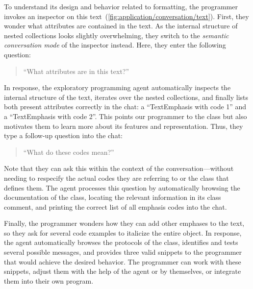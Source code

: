 To understand its design and behavior related to formatting, the programmer invokes an inspector on this text~(\cref{fig:application/conversation/text}).
First, they wonder what attributes are contained in the text.
As the internal structure of nested collections looks slightly overwhelming, they switch to the \emph{semantic conversation mode} of the inspector instead.
Here, they enter the following question:

\begin{quote}
	``What attributes are in this text?''
\end{quote}

In response, the exploratory programming agent automatically inspects the internal structure of the text, iterates over the nested collections, and finally lists both present attributes correctly in the chat: a ``TextEmphasis with code 1'' and a ``TextEmphasis with code 2''.
This points our programmer to the  class but also motivates them to learn more about its features and representation.
Thus, they type a follow-up question into the chat:

\begin{quote}
	``What do these codes mean?''
\end{quote}

Note that they can ask this within the context of the conversation---without needing to respecify the actual codes they are referring to or the class that defines them.
The agent processes this question by automatically browsing the documentation of the  class, locating the relevant information in its class comment, and printing the correct list of all emphasis codes into the chat.

Finally, the programmer wonders how they can add other emphases to the text, so they ask for several code examples to italicize the entire object.
In response, the agent automatically browses the protocols of the  class, identifies and tests several possible messages, and provides three valid snippets to the programmer that would achieve the desired behavior.
The programmer can work with these snippets, adjust them with the help of the agent or by themselves, or integrate them into their own program.

